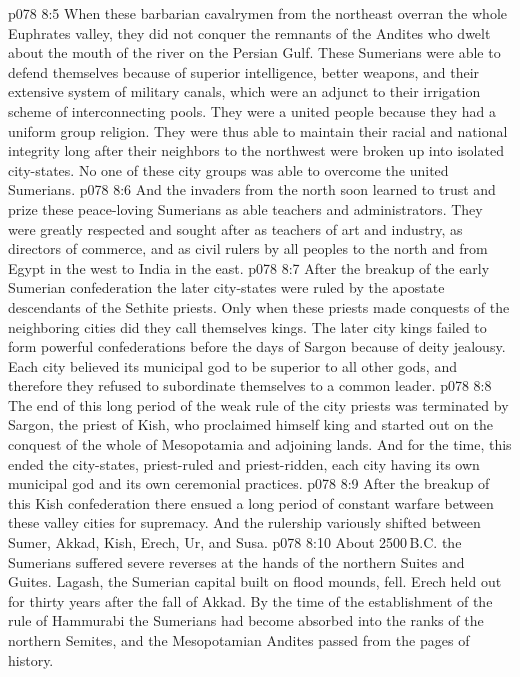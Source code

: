 \vs p078 8:5 When these barbarian cavalrymen from the northeast overran the whole Euphrates valley, they did not conquer the remnants of the Andites who dwelt about the mouth of the river on the Persian Gulf. These Sumerians were able to defend themselves because of superior intelligence, better weapons, and their extensive system of military canals, which were an adjunct to their irrigation scheme of interconnecting pools. They were a united people because they had a uniform group religion. They were thus able to maintain their racial and national integrity long after their neighbors to the northwest were broken up into isolated city\hyp{}states. No one of these city groups was able to overcome the united Sumerians.
\vs p078 8:6 And the invaders from the north soon learned to trust and prize these peace\hyp{}loving Sumerians as able teachers and administrators. They were greatly respected and sought after as teachers of art and industry, as directors of commerce, and as civil rulers by all peoples to the north and from Egypt in the west to India in the east.
\vs p078 8:7 After the breakup of the early Sumerian confederation the later city\hyp{}states were ruled by the apostate descendants of the Sethite priests. Only when these priests made conquests of the neighboring cities did they call themselves kings. The later city kings failed to form powerful confederations before the days of Sargon because of deity jealousy. Each city believed its municipal god to be superior to all other gods, and therefore they refused to subordinate themselves to a common leader.
\vs p078 8:8 The end of this long period of the weak rule of the city priests was terminated by Sargon, the priest of Kish, who proclaimed himself king and started out on the conquest of the whole of Mesopotamia and adjoining lands. And for the time, this ended the city\hyp{}states, priest\hyp{}ruled and priest\hyp{}ridden, each city having its own municipal god and its own ceremonial practices.
\vs p078 8:9 After the breakup of this Kish confederation there ensued a long period of constant warfare between these valley cities for supremacy. And the rulership variously shifted between Sumer, Akkad, Kish, Erech, Ur, and Susa.
\vs p078 8:10 About 2500\,B.C. the Sumerians suffered severe reverses at the hands of the northern Suites and Guites. Lagash, the Sumerian capital built on flood mounds, fell. Erech held out for thirty years after the fall of Akkad. By the time of the establishment of the rule of Hammurabi the Sumerians had become absorbed into the ranks of the northern Semites, and the Mesopotamian Andites passed from the pages of history.
